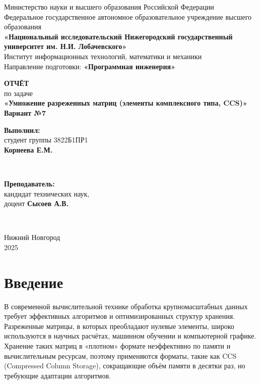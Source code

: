 \documentclass[12pt]{extarticle}
\begin{document}
\begin{titlepage}
    \centering
    \large
    Министерство науки и высшего образования Российской Федерации\\
    Федеральное государственное автономное образовательное учреждение высшего образования\\
    \textbf{«Национальный исследовательский Нижегородский государственный университет им. Н.И. Лобачевского»}\\[0.25cm]
    Институт информационных технологий, математики и механики\\
    Направление подготовки: \textbf{«Программная инженерия»}\\[1cm]
    
    \vfill
    
    {\LARGE \textbf{ОТЧЁТ}}\\
    {\Large по задаче}\\
    {\LARGE \textbf{«Умножение разреженных матриц (элементы комплексного типа, CCS)»}}\\
    {\Large \textbf{Вариант №7}}\\
    
    \vfill
    
    \hfill\parbox{0.4\textwidth}{
        \textbf{Выполнил:} \\
        студент группы 3822Б1ПР1 \\
        \textbf{Корнеева Е.М.}
    }\\[0.5cm]
    
    \hfill\parbox{0.4\textwidth}{
        \textbf{Преподаватель:} \\
        кандидат технических наук,\\
        доцент \textbf{Сысоев А.В.}
    }\\[0.5cm]
    
    \vfill
    
    Нижний Новгород\\
    2025
\end{titlepage}


\thispagestyle{empty}
\clearpage
{} 
\setcounter{page}{2} 
\tableofcontents
\clearpage
\setcounter{page}{3} 
\section{Введение}
\hspace*{1.25cm}В современной вычислительной технике обработка крупномасштабных данных требует эффективных алгоритмов и оптимизированных структур хранения. Разреженные матрицы, в которых преобладают нулевые элементы, широко используются в научных расчётах, машинном обучении и компьютерной графике. Хранение таких матриц в «плотном» формате неэффективно по памяти и вычислительным ресурсам, поэтому применяются форматы, такие как CCS (Compressed Column Storage), сокращающие объём памяти в десятки раз, но требующие адаптации алгоритмов.
\end{document}
